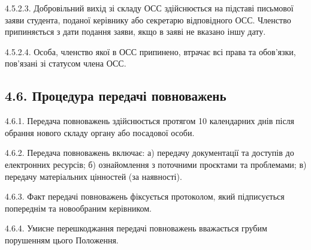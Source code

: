         4.5.2.3. Добровільний вихід зі складу ОСС здійснюється на підставі письмової заяви студента, поданої керівнику або секретарю відповідного ОСС. Членство припиняється з дати подання заяви, якщо в заяві не вказано іншу дату.

        4.5.2.4. Особа, членство якої в ОСС припинено, втрачає всі права та обов'язки, пов'язані зі статусом члена ОСС.

\subsection*{4.6. Процедура передачі повноважень}

4.6.1. Передача повноважень здійснюється протягом 10 календарних днів після обрання нового складу органу або посадової особи.

4.6.2. Передача повноважень включає:
   а) передачу документації та доступів до електронних ресурсів;
   б) ознайомлення з поточними проєктами та проблемами;
   в) передачу матеріальних цінностей (за наявності).

4.6.3. Факт передачі повноважень фіксується протоколом, який підписується попереднім та новообраним керівником.

4.6.4. Умисне перешкоджання передачі повноважень вважається грубим порушенням цього Положення.

